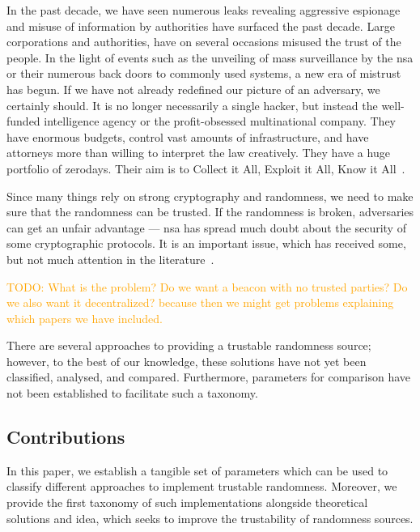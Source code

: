 In the past decade, we have seen numerous leaks revealing aggressive espionage and misuse of information by authorities have surfaced the past decade.
Large corporations and authorities, have on several occasions misused the trust of the people.
In the light of events such as the unveiling of mass surveillance by the \gls{nsa} or their numerous back doors to commonly used systems, a new era of mistrust has begun. If we have not already redefined our picture of an adversary, we certainly should. It is no longer necessarily a single hacker, but instead the well-funded intelligence agency or the profit-obsessed multinational company. They have enormous budgets, control vast amounts of infrastructure, and have attorneys more than willing to interpret the law creatively. They have a huge portfolio of zerodays. Their aim is to Collect it All, Exploit it All, Know it All~\cite{rogaway2015moral}.


Since many things rely on strong cryptography and randomness, we need to make sure that the randomness can be trusted. If the randomness is broken, adversaries can get an unfair advantage --- \gls{nsa} has spread much doubt about the security of some cryptographic protocols. It is an important issue, which has received some, but not much attention in the literature~\cite{lenstra2015random}.

\textcolor{orange}{TODO: What is the problem? Do we want a beacon with no trusted parties? Do we also want it decentralized? because then we might get problems explaining which papers we have included.}

There are several approaches to providing a trustable randomness source; however, to the best of our knowledge, these solutions have not yet been classified, analysed, and compared.
Furthermore, parameters for comparison have not been established to facilitate such a taxonomy.

\subsection*{Contributions}\label{subsec:contributions}
In this paper, we establish a tangible set of parameters which can be used to classify different approaches to implement trustable randomness.
Moreover, we provide the first taxonomy of such implementations alongside theoretical solutions and idea, which seeks to improve the trustability of randomness sources.

